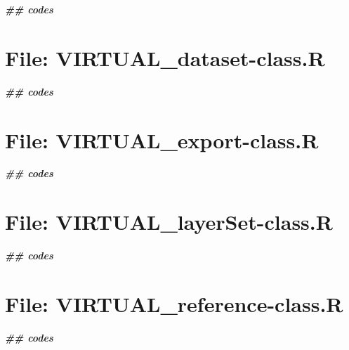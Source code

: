 \documentclass[
]{article}
\newenvironment{Shaded}{\begin{snugshade}}{\end{snugshade}}
\newcommand{\DocumentationTok}[1]{\textcolor[rgb]{0.56,0.35,0.01}{\textbf{\textit{#1}}}}
\begin{document}
\begin{Shaded}
\begin{Highlighting}[]
\DocumentationTok{\#\# codes}
\end{Highlighting}
\end{Shaded}

\hypertarget{file-virtual_dataset-class.r}{%
\section{File: VIRTUAL\_dataset-class.R}\label{file-virtual_dataset-class.r}}

\begin{Shaded}
\begin{Highlighting}[]
\DocumentationTok{\#\# codes}
\end{Highlighting}
\end{Shaded}

\hypertarget{file-virtual_export-class.r}{%
\section{File: VIRTUAL\_export-class.R}\label{file-virtual_export-class.r}}

\begin{Shaded}
\begin{Highlighting}[]
\DocumentationTok{\#\# codes}
\end{Highlighting}
\end{Shaded}

\hypertarget{file-virtual_layerset-class.r}{%
\section{File: VIRTUAL\_layerSet-class.R}\label{file-virtual_layerset-class.r}}

\begin{Shaded}
\begin{Highlighting}[]
\DocumentationTok{\#\# codes}
\end{Highlighting}
\end{Shaded}

\hypertarget{file-virtual_reference-class.r}{%
\section{File: VIRTUAL\_reference-class.R}\label{file-virtual_reference-class.r}}

\begin{Shaded}
\begin{Highlighting}[]
\DocumentationTok{\#\# codes}
\end{Highlighting}
\end{Shaded}
\end{document}
